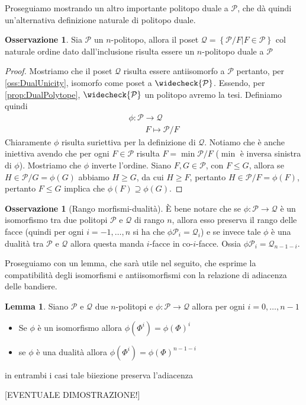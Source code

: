 \documentclass[a4paper,12pt]{report}
\newcommand{\p}{\mathcal{P}}
\theoremstyle{plain}
\theoremstyle{definition}
\newtheorem{lem}[teo]{Lemma}
\newtheorem{oss}[teo]{Osservazione}
\begin{document}
Proseguiamo mostrando un altro importante politopo duale a $\p$, che d\`a quindi un'alternativa definizione naturale di politopo duale.

\begin{oss}
Sia $\p$ un $n$-politopo, allora il poset $\mathcal{Q}=\left\{\p/F|F\in\p\right\}$ col naturale ordine dato dall'inclusione risulta essere un
$n$-politopo duale a $\p$
\end{oss}
\begin{proof}
Mostriamo che il poset $\mathcal{Q}$ risulta essere antiisomorfo a $\p$ pertanto, per \ref{oss:DualUnicity}, isomorfo come poset a $\widecheck{\p}$.
Essendo, per \ref{prop:DualPolytope}, $\widecheck{\p}$ un politopo avremo la tesi.
Definiamo quindi
\begin{gather*}
\phi:\p\longrightarrow\mathcal{Q}\\
\qquad F\longmapsto\p/F
\end{gather*}
Chiaramente $\phi$ risulta suriettiva per la definizione di $\mathcal{Q}$. Notiamo che \`e anche iniettiva avendo che per ogni $F\in\p$ risulta
$F=\min\p/F$ ($\min$ \`e inversa sinistra di $\phi$). Mostriamo che $\phi$ inverte l'ordine. Siano $F,G\in\p$, con $F\leq G$, allora se
$H\in\p/G=\phi(G)$ abbiamo $H\geq G$, da cui $H\geq F$, pertanto $H\in\p/F=\phi(F)$, pertanto $F\leq G$ implica che $\phi(F)\supseteq\phi(G)$.
\end{proof}

\begin{oss}[Rango morfismi-dualit\`a]
\label{morphRank}
\`E bene notare che se $\phi:\p\longrightarrow\mathcal{Q}$ \`e un isomorfismo tra due politopi $\p$ e $\mathcal{Q}$ di rango $n$, allora esso
preserva il rango delle facce (quindi per ogni $i=-1,\dots,n$ si ha che $\phi\p_i=\mathcal{Q}_i$) e se invece tale $\phi$ \`e una dualit\`a tra
$\p$ e $\mathcal{Q}$ allora questa manda $i$-facce in co-$i$-facce. Ossia $\phi\p_i=\mathcal{Q}_{n-1-i}$.
\end{oss}
Proseguiamo con un lemma, che sar\`a utile nel seguito, che esprime la compatibilit\`a degli isomorfismi e antiisomorfismi con la relazione di
adiacenza delle bandiere.
\begin{lem}
\label{morphAdj}
Siano $\p$ e $\mathcal{Q}$ due $n$-politopi e $\phi:\p\longrightarrow\mathcal{Q}$ allora per ogni $i=0,\dots,n-1$
\begin{itemize}
\item Se $\phi$ \`e un isomorfismo allora $\phi(\Phi^i)=\phi(\Phi)^i$
\item se $\phi$ \`e una dualit\`a allora $\phi(\Phi^i)=\phi(\Phi)^{n-1-i}$
\end{itemize}
in entrambi i casi tale biiezione preserva l'adiacenza
\end{lem}
[EVENTUALE DIMOSTRAZIONE!]
\end{document}
